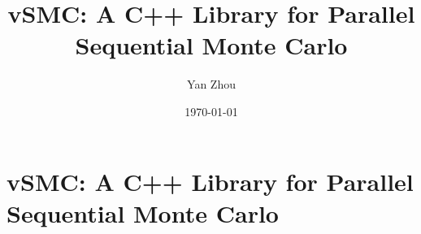 \documentclass[11pt, hyper, bib, fontset=Minion]{marticle}
\title{vSMC: A C++ Library for Parallel Sequential Monte Carlo}
\author{Yan Zhou}
\date{\today}
\begin{document}
\maketitle

\else %

\chapter{vSMC: A C++ Library for Parallel Sequential Monte Carlo}
\label{cha:vSMC: A C++ Library for Parallel Sequential Monte Carlo}

\fi %


\ifx\inthesis\undefined
\printbibliography
\end{document}

